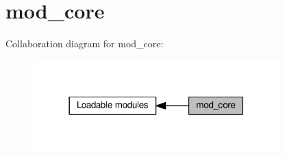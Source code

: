 \hypertarget{group__MOD__CORE}{}\section{mod\+\_\+core}
\label{group__MOD__CORE}
Collaboration diagram for mod\+\_\+core\+:
\nopagebreak
\begin{figure}[H]
\begin{center}
\leavevmode
\includegraphics[width=270pt]{group__MOD__CORE}
\end{center}
\end{figure}
